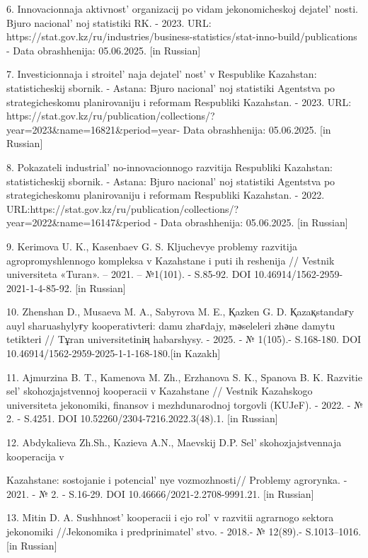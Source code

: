 6. Innovacionnaja aktivnost'{} organizacij po vidam
jekonomicheskoj dejatel' nosti. Bjuro
nacional' noj statistiki RK. - 2023. URL:
https://stat.gov.kz/ru/industries/business-statistics/stat-inno-build/publications
- Data obrashhenija: 05.06.2025. {[}in Russian{]}

7. Investicionnaja i stroitel' naja
dejatel' nost'{} v Respublike Kazahstan:
statisticheskij sbornik. - Astana: Bjuro nacional' noj
statistiki Agentstva po strategicheskomu planirovaniju i reformam
Respubliki Kazahstan. - 2023. URL:
https://stat.gov.kz/ru/publication/collections/?year=2023\&name=16821\&period=year-
Data obrashhenija: 05.06.2025. {[}in Russian{]}

8. Pokazateli industrial' no-innovacionnogo razvitija
Respubliki Kazahstan: statisticheskij sbornik. - Astana: Bjuro
nacional' noj statistiki Agentstva po strategicheskomu
planirovaniju i reformam Respubliki Kazahstan. - 2022.
URL:https://stat.gov.kz/ru/publication/collections/?year=2022\&name=16147\&period
- Data obrashhenija: 05.06.2025. {[}in Russian{]}

9. Kerimova U. K., Kasenbaev G. S. Kljuchevye problemy razvitija
agropromyshlennogo kompleksa v Kazahstane i puti ih reshenija // Vestnik
universiteta «Turan». -- 2021. -- №1(101). - S.85-92. DOI
10.46914/1562-2959-2021-1-4-85-92. {[}in Russian{]}

10. Zhenshan D., Musaeva M. A., Sabyrova M. E., Қazken G. D.
Қazaқstandaғy auyl sharuashylyғy kooperativterі: damu zhaғdajy,
mәselelerі zhәne damytu tetіkterі // Tұran universitetіnің habarshysy. -
2025. - № 1(105).- S.168-180. DOI
10.46914/1562-2959-2025-1-1-168-180.{[}in Kazakh{]}

11. Ajmurzina B. T., Kamenova M. Zh., Erzhanova S. K., Spanova B. K.
Razvitie sel' skohozjajstvennoj kooperacii v Kazahstane
// Vestnik Kazahskogo universiteta jekonomiki, finansov i mezhdunarodnoj
torgovli (KUJeF). - 2022. - № 2. - S.4251. DOI
10.52260/2304-7216.2022.3(48).1. {[}in Russian{]}

12. Abdykalieva Zh.Sh., Kazieva A.N., Maevskij D.P.
Sel' skohozjajstvennaja kooperacija v

Kazahstane: sostojanie i potencial' nye vozmozhnosti//
Problemy agrorynka. - 2021. - № 2. - S.16-29. DOI
10.46666/2021-2.2708-9991.21. {[}in Russian{]}

13. Mitin D. A. Sushhnost'{} kooperacii i ejo
rol'{} v razvitii agrarnogo sektora jekonomiki
//Jekonomika i predprinimatel' stvo. - 2018.- № 12(89).-
S.1013--1016. {[}in Russian{]}

